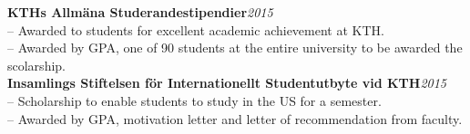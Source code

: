 \documentclass[10pt]{article}
\begin{document}
\noindent\textbf{KTHs Allmäna Studerandestipendier}\hfill\textit{2015}\\
\indent-- Awarded to students for excellent academic achievement at KTH.\\
\indent-- Awarded by GPA, one of 90 students at the entire university to be awarded the scolarship.\\

\noindent\textbf{Insamlings Stiftelsen för Internationellt Studentutbyte  vid KTH}\hfill\textit{2015}\\
\indent-- Scholarship to enable students to study in the US for a semester.\\
\indent-- Awarded by GPA, motivation letter and letter of recommendation from faculty.\\
\end{document}
